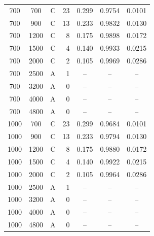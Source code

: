 \begin{longtable}{ccrrccc}
700 & 700 & C & 23 & 0.299 & 0.9754 & 0.0101 \\
700 & 900 & C & 13 & 0.233 & 0.9832 & 0.0130 \\
700 & 1200 & C & 8 & 0.175 & 0.9898 & 0.0172 \\
700 & 1500 & C & 4 & 0.140 & 0.9933 & 0.0215 \\
700 & 2000 & C & 2 & 0.105 & 0.9969 & 0.0286 \\
700 & 2500 & A & 1 & -- & -- & -- \\
700 & 3200 & A & 0 & -- & -- & -- \\
700 & 4000 & A & 0 & -- & -- & -- \\
700 & 4800 & A & 0 & -- & -- & -- \\
1000 & 700 & C & 23 & 0.299 & 0.9684 & 0.0101 \\
1000 & 900 & C & 13 & 0.233 & 0.9794 & 0.0130 \\
1000 & 1200 & C & 8 & 0.175 & 0.9880 & 0.0172 \\
1000 & 1500 & C & 4 & 0.140 & 0.9922 & 0.0215 \\
1000 & 2000 & C & 2 & 0.105 & 0.9964 & 0.0286 \\
1000 & 2500 & A & 1 & -- & -- & -- \\
1000 & 3200 & A & 0 & -- & -- & -- \\
1000 & 4000 & A & 0 & -- & -- & -- \\
1000 & 4800 & A & 0 & -- & -- & -- \\
\bottomrule
\end{longtable}